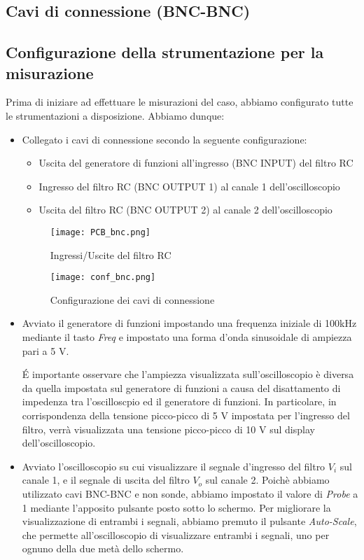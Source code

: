 \subsection*{Cavi di connessione (BNC-BNC)}
\clearpage
\subsection{Configurazione della strumentazione per la misurazione}
Prima di iniziare ad effettuare le misurazioni del caso, abbiamo configurato tutte le strumentazioni a disposizione. Abbiamo dunque:

\begin{itemize}
    \item Collegato i cavi di connessione secondo la seguente configurazione:
    \begin{itemize}
        \item Uscita del generatore di funzioni all'ingresso (BNC INPUT) del filtro RC
        \item Ingresso del filtro RC (BNC OUTPUT 1) al canale 1 dell'oscilloscopio
        \item Uscita del filtro RC (BNC OUTPUT 2) al canale 2 dell'oscilloscopio
    \end{itemize}
    \begin{figure}[h]
        \centering
        \texttt{[image: PCB\_bnc.png]}
        \caption{Ingressi/Uscite del filtro RC}
        \label{fig:pcb_bnc}
    \end{figure}
    \begin{figure}[h]
        \centering
        \texttt{[image: conf\_bnc.png]}
        \caption{Configurazione dei cavi di connessione}
        \label{fig:conf_bnc}
    \end{figure}
    \FloatBarrier

    \item Avviato il generatore di funzioni impostando una frequenza iniziale di 100kHz mediante il tasto \emph{Freq} e impostato una forma d'onda sinusoidale di ampiezza pari a 5 V.
    
    \'E importante osservare che l'ampiezza visualizzata sull'oscilloscopio è diversa da quella impostata sul generatore di funzioni a causa del disattamento di impedenza tra l'oscilloscpio ed il generatore di funzioni. In particolare, in corrispondenza della tensione picco-picco di 5 V impostata per l'ingresso del filtro, verrà visualizzata una tensione picco-picco di 10 V sul display dell'oscilloscopio.
    \item Avviato l'oscilloscopio su cui visualizzare il segnale d'ingresso del filtro $V_i$ sul canale 1, e il segnale di uscita del filtro $V_o$ sul canale 2.
    Poichè abbiamo utilizzato cavi BNC-BNC e non sonde, abbiamo impostato il valore di \emph{Probe} a 1 mediante l'apposito pulsante posto sotto lo schermo.
    Per migliorare la visualizzazione di entrambi i segnali, abbiamo premuto il pulsante \emph{Auto-Scale}, che permette all'oscilloscopio di visualizzare entrambi i segnali, uno per ognuno della due metà dello schermo.
    

\end{itemize}
